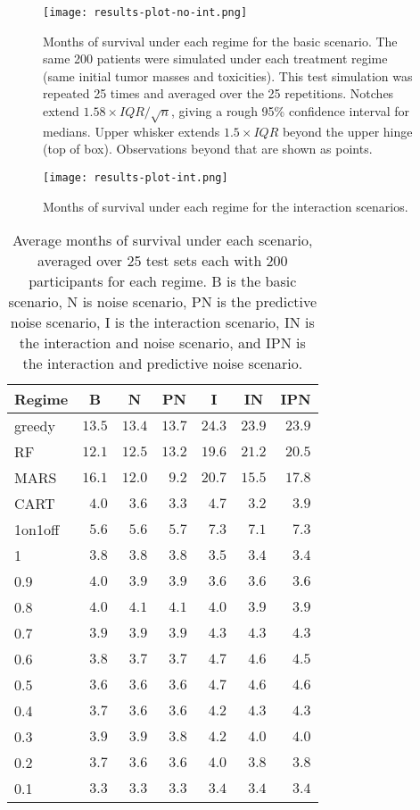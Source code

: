 \documentclass[12pt]{article}
\begin{document}
\begin{figure}[H]
\begin{center}
\texttt{[image: results-plot-no-int.png]}
\end{center}
\caption[Months of survival under scenarios without interaction]{Months of survival under each regime for the basic scenario. The same 200 patients were simulated under each treatment regime (same initial tumor masses and toxicities). This test simulation was  repeated 25 times and averaged over the 25 repetitions. Notches extend $1.58 \times IQR / \sqrt{n}$, giving a rough 95\% confidence interval for medians. Upper whisker extends $1.5 \times IQR$ beyond the upper hinge (top of box). Observations beyond that are shown as points.}
\label{fig:results-no-int}
\end{figure}

\begin{figure}[H]
\begin{center}
\texttt{[image: results-plot-int.png]}
\end{center}
\caption[Months of survival under scenarios with interaction]{Months of survival under each regime for the interaction scenarios.}
\label{fig:results-int}
\end{figure}

\begin{table}[H]
\caption[Average months of survival under each scenario]{Average months of survival under each scenario, averaged over 25 test sets each with 200 participants for each regime. B is the basic scenario, N is noise scenario, PN is the predictive noise scenario, I is the interaction scenario, IN is the interaction and noise scenario, and IPN is the interaction and predictive noise scenario.}
\begin{center}
\begin{tabular}{lrrrrrr}
\toprule
\multicolumn{1}{c}{Regime}&\multicolumn{1}{c}{B}&\multicolumn{1}{c}{N}&\multicolumn{1}{c}{PN}&\multicolumn{1}{c}{I}&\multicolumn{1}{c}{IN}&\multicolumn{1}{c}{IPN}\tabularnewline
\midrule
greedy&$13.5$&$13.4$&$13.7$&$24.3$&$23.9$&$23.9$\tabularnewline
RF&$12.1$&$12.5$&$13.2$&$19.6$&$21.2$&$20.5$\tabularnewline
MARS&$16.1$&$12.0$&$ 9.2$&$20.7$&$15.5$&$17.8$\tabularnewline
CART&$ 4.0$&$ 3.6$&$ 3.3$&$ 4.7$&$ 3.2$&$ 3.9$\tabularnewline
1on1off&$ 5.6$&$ 5.6$&$ 5.7$&$ 7.3$&$ 7.1$&$ 7.3$\tabularnewline
1&$ 3.8$&$ 3.8$&$ 3.8$&$ 3.5$&$ 3.4$&$ 3.4$\tabularnewline
0.9&$ 4.0$&$ 3.9$&$ 3.9$&$ 3.6$&$ 3.6$&$ 3.6$\tabularnewline
0.8&$ 4.0$&$ 4.1$&$ 4.1$&$ 4.0$&$ 3.9$&$ 3.9$\tabularnewline
0.7&$ 3.9$&$ 3.9$&$ 3.9$&$ 4.3$&$ 4.3$&$ 4.3$\tabularnewline
0.6&$ 3.8$&$ 3.7$&$ 3.7$&$ 4.7$&$ 4.6$&$ 4.5$\tabularnewline
0.5&$ 3.6$&$ 3.6$&$ 3.6$&$ 4.7$&$ 4.6$&$ 4.6$\tabularnewline
0.4&$ 3.7$&$ 3.6$&$ 3.6$&$ 4.2$&$ 4.3$&$ 4.3$\tabularnewline
0.3&$ 3.9$&$ 3.9$&$ 3.8$&$ 4.2$&$ 4.0$&$ 4.0$\tabularnewline
0.2&$ 3.7$&$ 3.6$&$ 3.6$&$ 4.0$&$ 3.8$&$ 3.8$\tabularnewline
0.1&$ 3.3$&$ 3.3$&$ 3.3$&$ 3.4$&$ 3.4$&$ 3.4$\tabularnewline
\bottomrule
\end{tabular}\end{center}
\end{table}
\end{document}
